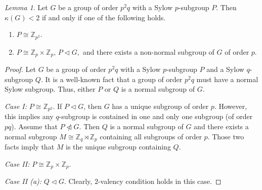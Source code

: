 \documentclass[a4paper,12pt]{article}
\theoremstyle{definition}
\theoremstyle{remark}
\theoremstyle{theorem}
\newtheorem{lem}[theorem]{Lemma}
\begin{document}
\begin{lem}\label{lem:p2q}
  Let $G$ be a group of order $p^2q$ with a Sylow $p$-subgroup $P$.
  Then $\kappa(G)<2$ if and only if one of the following holds.
  \begin{enumerate}
  \item $P\cong \mathbb{Z}_{p^2}$.
  \item $P\cong \mathbb{Z}_p\times\mathbb{Z}_p,\, P\triangleleft G,$ and there exists a
    non-normal subgroup of $G$ of order $p$.
  \end{enumerate}
\end{lem}

\begin{proof}
  Let $G$ be a group of order $p^2q$ with a Sylow $p$-subgroup $P$ and
  a Sylow $q$-subgroup $Q$. It is a well-known fact that a group of order $p^2q$
must have a normal Sylow subgroup. Thus, either $P$ or $Q$ is a normal subgroup of $G$.
  
  \emph{Case I:} $P\cong\mathbb{Z}_{p^2}$. If $P\triangleleft G$, then
  $G$ has a unique subgroup of order $p$. However, this implies any
  $q$-subgroup is contained in one and only one subgroup (of order
  $pq$). Assume that $P\ntriangleleft G$. Then $Q$ is a normal
  subgroup of $G$ and there exists a normal subgroup
  $M\cong\mathbb{Z}_q\rtimes\mathbb{Z}_p$ containing all subgroups of
  order $p$. Those two facts imply that $M$ is the unique subgroup
  containing $Q$.

  \emph{Case II:} $P\cong\mathbb{Z}_p\times\mathbb{Z}_p$.

  \emph{Case II (a):} $Q\triangleleft G$. Clearly, $2$-valency condition holds in this case. 


\end{proof}
\end{document}

